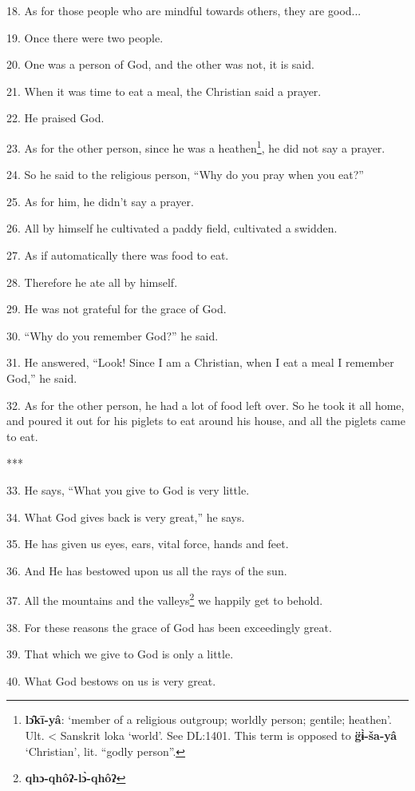 18. As for those people who are mindful towards others, they are good...

19. Once there were two people.

20. One was a person of God, and the other was not, it is said.

21. When it was time to eat a meal, the Christian said a prayer.

22. He praised God.

23. As for the other person, since he was a heathen\footnote{\textbf{lɔ̂kī-yâ}: `member of a religious outgroup; worldly person; gentile; heathen'. Ult. < Sanskrit loka `world'. See DL:1401. This term is opposed to \textbf{g̈ɨ̀-ša-yâ} `Christian', lit. ``godly person''.}, he did not say a prayer.

24. So he said to the religious person, ``Why do you pray when you eat?''

25. As for him, he didn't say a prayer.

26. All by himself he cultivated a paddy field, cultivated a swidden.

27. As if automatically there was food to eat.

28. Therefore he ate all by himself.

29. He was not grateful for the grace of God.

30. ``Why do you remember God?'' he said.

31. He answered, ``Look! Since I am a Christian, when I eat a meal I remember God,''
he said.

32. As for the other person, he had a lot of food left over. So he took it all
home, and poured it out for his piglets to eat around his house, and all the piglets
came to eat.

***

33. He says, ``What you give to God is very little.

34. What God gives back is very great,'' he says.

35. He has given us eyes, ears, vital force, hands and feet.

36. And He has bestowed upon us all the rays of the sun.

37. All the mountains and the valleys\footnote{\textbf{qhɔ-qhôʔ-lɔ̀-qhôʔ}} we happily get to behold.

38. For these reasons the grace of God has been exceedingly great.

39. That which we give to God is only a little.

40. What God bestows on us is very great.

